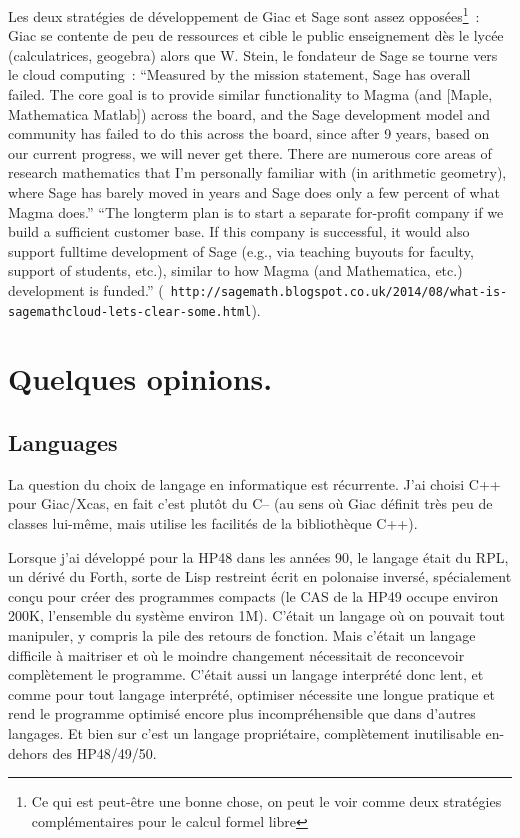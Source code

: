 \documentclass[a4paper,11pt]{article}
\begin{document}
\begin{giacjshere}
Les deux strat\'egies de d\'eveloppement de Giac et Sage
sont assez oppos\'ees\footnote{Ce qui est peut-\^etre une bonne chose,
on peut le voir comme deux strat\'egies compl\'ementaires pour le
calcul formel libre}~: Giac se contente de peu de ressources et cible le 
public enseignement d\`es le lyc\'ee (calculatrices, geogebra) alors
que W. Stein, le fondateur de Sage se tourne vers le cloud computing~:
``Measured by the mission statement, Sage has overall failed. The core
goal is to provide similar functionality to Magma (and [Maple,
Mathematica Matlab]) across the board, and the Sage development model
and community has failed to do this across the board, since after 9
years, based on our current progress, we will never get there. There
are numerous core areas of research mathematics that I'm personally
familiar with (in arithmetic geometry), where Sage has barely moved in
years and Sage does only a few percent of what Magma does.''
``The longterm plan is to start a separate for-profit company if we
build a sufficient customer base. If this company is successful, it
would also support fulltime development of Sage (e.g., via teaching
buyouts for faculty, support of students, etc.), similar to how Magma
(and Mathematica, etc.) development is funded.'' ({\tt \tiny
  http://sagemath.blogspot.co.uk/2014/08/what-is-sagemathcloud-lets-clear-some.html}).

\section{Quelques opinions.}
\subsection{Languages}
La question du choix de langage en informatique est r\'ecurrente.
J'ai choisi C++ pour Giac/Xcas, en fait c'est plut\^ot du C-- (au
sens o\`u Giac d\'efinit tr\`es peu de classes lui-m\^eme, mais
utilise les facilit\'es de la biblioth\`eque C++).

Lorsque j'ai d\'evelopp\'e pour la HP48 dans les ann\'ees 90, le langage
\'etait du RPL, un d\'eriv\'e du Forth, sorte de Lisp restreint \'ecrit
en polonaise invers\'e, sp\'ecialement con\c{c}u pour cr\'eer
des programmes compacts (le CAS de la HP49 occupe environ
200K, l'ensemble du syst\`eme environ 1M).
C'\'etait un langage o\`u on pouvait
tout manipuler, y compris la pile des retours de fonction.
Mais c'\'etait un langage difficile \`a maitriser et o\`u le
moindre changement n\'ecessitait de reconcevoir compl\`etement
le programme. C'\'etait aussi un langage interpr\'et\'e donc lent,
et comme pour tout langage interpr\'et\'e, optimiser n\'ecessite
une longue pratique et rend le programme optimis\'e encore plus
incompr\'ehensible que dans d'autres langages.
Et bien sur c'est un langage propri\'etaire, compl\`etement
inutilisable en-dehors des HP48/49/50.


\end{giacjshere}
\end{document}
